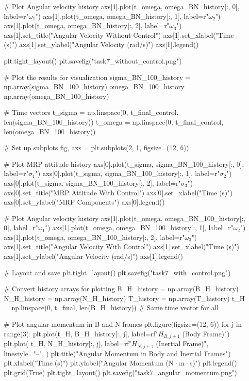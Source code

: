 \documentclass[conf]{new-aiaa}
\begin{document}
\begin{pythoncode}
# Plot Angular velocity history
axs[1].plot(t_omega, omega_BN_history[:, 0], label=r"$\omega_1$")
axs[1].plot(t_omega, omega_BN_history[:, 1], label=r"$\omega_2$")
axs[1].plot(t_omega, omega_BN_history[:, 2], label=r"$\omega_3$")
axs[1].set_title("Angular Velocity Without Control")
axs[1].set_xlabel("Time (s)")
axs[1].set_ylabel("Angular Velocity (rad/s)")
axs[1].legend()

plt.tight_layout()
plt.savefig("task7_without_control.png")

# Plot the results for visualization
sigma_BN_100_history = np.array(sigma_BN_100_history)
omega_BN_100_history = np.array(omega_BN_100_history)

# Time vectors
t_sigma = np.linspace(0, t_final_control, len(sigma_BN_100_history))
t_omega = np.linspace(0, t_final_control, len(omega_BN_100_history))

# Set up subplots
fig, axs = plt.subplots(2, 1, figsize=(12, 6))

# Plot MRP attitude history
axs[0].plot(t_sigma, sigma_BN_100_history[:, 0], label=r"$\sigma_1$")
axs[0].plot(t_sigma, sigma_BN_100_history[:, 1], label=r"$\sigma_2$")
axs[0].plot(t_sigma, sigma_BN_100_history[:, 2], label=r"$\sigma_3$")
axs[0].set_title("MRP Attitude With Control")
axs[0].set_xlabel("Time (s)")
axs[0].set_ylabel("MRP Components")
axs[0].legend()

# Plot Angular velocity history
axs[1].plot(t_omega, omega_BN_100_history[:, 0], label=r"$\omega_1$")
axs[1].plot(t_omega, omega_BN_100_history[:, 1], label=r"$\omega_2$")
axs[1].plot(t_omega, omega_BN_100_history[:, 2], label=r"$\omega_3$")
axs[1].set_title("Angular Velocity With Control")
axs[1].set_xlabel("Time (s)")
axs[1].set_ylabel("Angular Velocity (rad/s)")
axs[1].legend()

# Layout and save
plt.tight_layout()
plt.savefig("task7_with_control.png")


# Convert history arrays for plotting
B_H_history = np.array(B_H_history)
N_H_history = np.array(N_H_history)
T_history = np.array(T_history)
t_H = np.linspace(0, t_final, len(B_H_history))  # Same time vector for all

# Plot angular momentum in B and N frames
plt.figure(figsize=(12, 6))
for j in range(3):
    plt.plot(t_H, B_H_history[:, j], label=rf"$H_{{B,{j+1}}}$ (Body Frame)")
    plt.plot(
        t_H,
        N_H_history[:, j],
        label=rf"$H_{{N,{j+1}}}$ (Inertial Frame)",
        linestyle="--",
    )
plt.title("Angular Momentum in Body and Inertial Frames")
plt.xlabel("Time (s)")
plt.ylabel("Angular Momentum (N·m·s)")
plt.legend()
plt.grid(True)
plt.tight_layout()
plt.savefig("task7_angular_momentum.png")


\end{pythoncode}
\end{document}
